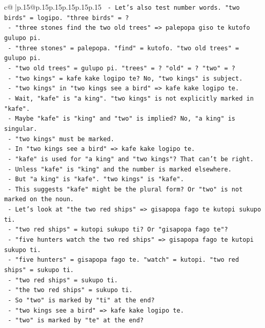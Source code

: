 \documentclass{article}
\begin{document}
{\begin{supertabular}{c@{$\;$}|p{.15\linewidth}@{}p{.15\linewidth}p{.15\linewidth}p{.15\linewidth}p{.15\linewidth}p{.15\linewidth}}
{{{\texttt{  {-} Let's also test number words. "two birds" = logipo. "three birds" = ?} \\
\texttt{  {-} "three stones find the two old trees" => palepopa giso te kutofo gulupo pi.} \\
\texttt{  {-} "three stones" = palepopa. "find" = kutofo. "two old trees" = gulupo pi.} \\
\texttt{  {-} "two old trees" = gulupo pi. "trees" = ? "old" = ? "two" = ?} \\
\texttt{  {-} "two kings" = kafe kake logipo te? No, "two kings" is subject.} \\
\texttt{  {-} "two kings" in "two kings see a bird" => kafe kake logipo te.} \\
\texttt{  {-} Wait, "kafe" is "a king". "two kings" is not explicitly marked in "kafe".} \\
\texttt{  {-} Maybe "kafe" is "king" and "two" is implied? No, "a king" is singular.} \\
\texttt{  {-} "two kings" must be marked.} \\
\texttt{  {-} In "two kings see a bird" => kafe kake logipo te.} \\
\texttt{  {-} "kafe" is used for "a king" and "two kings"? That can't be right.} \\
\texttt{  {-} Unless "kafe" is "king" and the number is marked elsewhere.} \\
\texttt{  {-} But "a king" is "kafe". "two kings" is "kafe".} \\
\texttt{  {-} This suggests "kafe" might be the plural form? Or "two" is not marked on the noun.} \\
\texttt{  {-} Let's look at "the two red ships" => gisapopa fago te kutopi sukupo ti.} \\
\texttt{  {-} "two red ships" = kutopi sukupo ti? Or "gisapopa fago te"?} \\
\texttt{  {-} "five hunters watch the two red ships" => gisapopa fago te kutopi sukupo ti.} \\
\texttt{  {-} "five hunters" = gisapopa fago te. "watch" = kutopi. "two red ships" = sukupo ti.} \\
\texttt{  {-} "two red ships" = sukupo ti.} \\
\texttt{  {-} "the two red ships" = sukupo ti.} \\
\texttt{  {-} So "two" is marked by "ti" at the end?} \\
\texttt{  {-} "two kings see a bird" => kafe kake logipo te.} \\
\texttt{  {-} "two" is marked by "te" at the end?} \\
}}}
\end{supertabular}}
\end{document}
